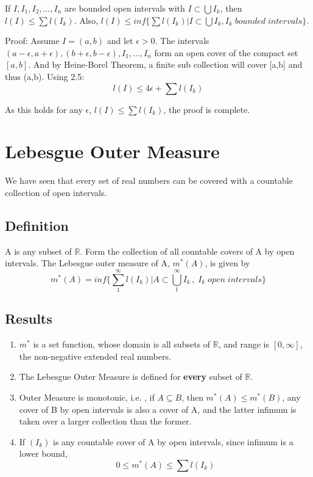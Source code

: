 \documentclass{article}
\begin{document}
If $I,I_1,I_2,\dots ,I_n$ are bounded open intervals with $ I \subset \bigcup I_k$, then $l(I) \leq \sum l(I_k)$. Also, $ l(I) \leq inf\{ \sum l(I_k) | I \subset \bigcup I_k, I_k \; bounded \; intervals \}$.\bigskip

Proof: Assume $I =(a,b)$ and let $\epsilon > 0$. The intervals $(a-\epsilon,a+\epsilon),(b+\epsilon,b-\epsilon),I_1,\dots ,I_n$ form an open cover of the compact set $[a,b]$. And by Heine-Borel Theorem, a finite sub collection will cover [a,b] and thus (a,b).
Using 2.5:
$$  l(I) \leq 4\epsilon +  \sum l(I_k)$$

As this holds for any $\epsilon$, $l(I) \leq \sum l(I_k)$, the proof is complete.
\newpage
\section{Lebesgue Outer Measure}

We have seen that every set of real numbers can be covered with a countable collection of open intervals.

\subsection{Definition}

A is any subset of $\mathbb{R}$. Form the collection of all countable covers of A by open intervals. The Lebesgue outer measure of A, $m^*(A)$, is given by
$$m^*(A)= inf\Big\{\sum_{1}^{\infty}l(I_k)| A \subset \bigcup_{1}^{\infty} I_k \, , \; I_k \; open \; intervals\Big\}$$

\subsection{Results}
\begin{enumerate}
    \item $m^*$ is a set function, whose domain is all subsets of $\mathbb{R}$, and range is $[0,\infty]$, the non-negative extended real numbers. 
    
    \item The Lebesgue Outer Measure is defined for \textbf{every} subset of $\mathbb{R}$.
    
    \item Outer Measure is monotonic, i.e. , if $A \subseteq B$, then $m^*(A) \leq m^*(B)$, any cover of B by open intervals is also a cover of A, and the latter infimum is taken over a larger collection than the former. 

    \item If $(I_k)$ is any countable cover of A by open intervals, since infimum is a lower bound,$$ 0 \leq m^*(A) \leq \sum l(I_k)$$
    


\end{enumerate}
\end{document}
